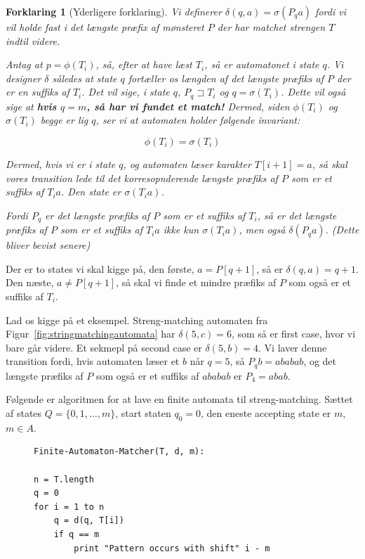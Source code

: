 \documentclass[11pt]{article}
\newtheorem{forklaring}[theorem]{Forklaring}
\theoremstyle{definition}
\theoremstyle{remark}
\begin{document}
\begin{forklaring}[Yderligere forklaring]
  \label{forkl:yderligeredfa}
  Vi definerer $\delta(q,a) = \sigma(P_{q}a)$ fordi vi vil holde fast i det længste præfix af mønsteret $P$ der har matchet strengen $T$ indtil videre.

  Antag at $p = \phi (T_{i})$, så, efter at have læst $T_{i}$, så er automatonet i state $q$. Vi designer $\delta$ således at state $q$ fortæller os længden af det længste præfiks af $P$ der er en suffiks af $T_{i}$. Det vil sige, i state $q$, $P_{q} \sqsupset T_{i}$ og $q = \sigma(T_{i})$. Dette vil også sige at \textbf{hvis $q = m$, så har vi fundet et match!} Dermed, siden $\phi (T_{i})$ og $\sigma(T_{i})$ begge er lig $q$, ser vi at automaten holder følgende invariant:

  \begin{equation}
    \label{32.5}
\phi(T_{i}) = \sigma(T_{i})
  \end{equation}

  Dermed, hvis vi er i state $q$, og automaten læser karakter $T[i+1] = a$, så skal vores transition lede til det korresopnderende længste præfiks af $P$ som er et suffiks af $T_{i}a$. Den state er $\sigma(T_{i}a)$. 
  
Fordi $P_{q}$ er det længste præfiks af $P$ som er et suffiks af $T_{i}$, så er det længste præfiks af $P$ som er et suffiks af $T_{i}a$ ikke kun $\sigma(T_{i}a)$, men også $\delta(P_qa)$. (Dette bliver bevist senere)
\end{forklaring}

Der er to states vi skal kigge på, den første, $a = P[q+1]$, så er $\delta(q,a) = q+1$.
Den næste, $a \neq P[q+1]$, så skal vi finde et mindre præfiks af $P$ som også er et suffiks af $T_{i}$.

Lad os kigge på et eksempel. Streng-matching automaten fra Figur~\ref{fig:stringmatchingautomata} har $\delta(5,c) = 6$, som så er first case, hvor vi bare går videre. Et sekmepl på second case er $\delta(5, b) = 4$. Vi laver denne transition fordi, hvis automaten læser et $b$ når $q = 5$, så $P_{q}b = ababab$, og det længste præfiks af $P$ som også er et suffiks af $ababab$ er $P_{4} = abab$.

Følgende er algoritmen for at lave en finite automata til streng-matching. Sættet af states $Q = \{0, 1, \ldots, m\}$, start staten $q_{0} = 0$, den eneste accepting state er $m$, ${m} \in A$.


\begin{figure}[ht]
  \centering
  \begin{verbatim}
Finite-Automaton-Matcher(T, d, m):

n = T.length
q = 0
for i = 1 to n
    q = d(q, T[i])
    if q == m
        print "Pattern occurs with shift" i - m
\end{verbatim}
  \caption{\label{fig:dfa-algorithm} }
\end{figure}
\end{document}
